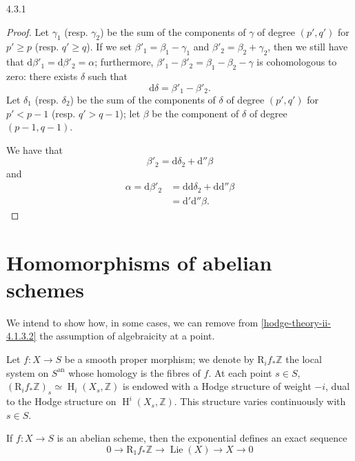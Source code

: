 \begin{proposition}{4.3.1}
\begin{proof}
      Let \(\gamma _1\) (resp. \(\gamma _2\)) be the sum of the components of \(\gamma \) of degree \((p',q')\) for \(p'\geqslant  p\) (resp. \(q'\geqslant  q\)).
      If we set \(\beta '_1=\beta _1-\gamma _1\) and \(\beta '_2=\beta _2+\gamma _2\), then we still have that \(\mathrm {d}\beta '_1=\mathrm {d}\beta '_2=\alpha \);
      furthermore, \(\beta '_1-\beta '_2=\beta _1-\beta _2-\gamma \) is cohomologous to zero: there exists \(\delta \) such that
      \[         \mathrm {d}\delta          = \beta '_1 - \beta '_2.       \]
      Let \(\delta _1\) (resp. \(\delta _2\)) be the sum of the components of \(\delta \) of degree \((p',q')\) for \(p'<p-1\) (resp. \(q'>q-1\));
      let \(\beta \) be the component of \(\delta \) of degree \((p-1,q-1)\).\par{}We have that
      \[         \beta '_2         =\mathrm {d}\delta _2 + \mathrm {d}''\beta        \]
      and
      \[         \begin {aligned}           \alpha            = \mathrm {d}\beta '_2           &= \mathrm {d}\mathrm {d}\delta _2 + \mathrm {d}\mathrm {d}''\beta          \\&= \mathrm {d}'\mathrm {d}''\beta .         \end {aligned}       \]\end{proof}\end{proposition}\section{Homomorphisms of abelian schemes}\label{hodge-theory-ii-4.4}\par{}We intend to show how, in some cases, we can remove from \cref{hodge-theory-ii-4.1.3.2} the assumption of algebraicity at a point.\label{hodge-theory-ii-4.4.1}\par{}Let \(f\colon  X\to  S\) be a smooth proper morphism;
    we denote by \(\mathrm {R}_i f_*\mathbb {Z}\) the local system on \(S^\mathrm {an}\) whose homology is the fibres of \(f\).
    At each point \(s\in  S\), \((\mathrm {R}_i f_*\mathbb {Z})_s\simeq \operatorname {H}_i(X_s,\mathbb {Z})\) is endowed with a Hodge structure of weight \(-i\), dual to the Hodge structure on \(\operatorname {H}^i(X_s,\mathbb {Z})\).
    This structure varies continuously with \(s\in  S\).\label{hodge-theory-ii-4.4.2}\par{}If \(f\colon  X\to  S\) is an abelian scheme, then the exponential defines an exact sequence
    \[       0       \to  \mathrm {R}_1f_*\mathbb {Z}       \to  \operatorname {Lie}(X)       \to  X       \to  0     \]
